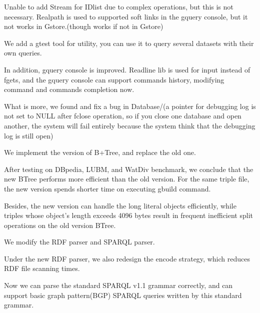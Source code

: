 \documentclass[titlepage, a4paper, 12pt]{article}
\begin{document}
Unable to add Stream for IDlist due to complex operations, but this is
not necessary. Realpath is used to supported soft links in the gquery
console, but it not works in Gstore.(though works if not in Gstore)


We add a gtest tool for utility, you can use it to query several
datasets with their own queries.

In addition, gquery console is improved. Readline lib is used for input
instead of fgets, and the gquery console can support commands history,
modifying command and commands completion now.

What is more, we found and fix a bug in Database/(a pointer for
debugging log is not set to NULL after fclose operation, so if you close
one database and open another, the system will fail entirely because the
system think that the debugging log is still open)


We implement the version of B+Tree, and replace the old one.

After testing on DBpedia, LUBM, and WatDiv benchmark, we conclude that
the new BTree performs more efficient than the old version. For the
same triple file, the new version spends shorter time on executing gbuild
command.

Besides, the new version can handle the long literal objects
efficiently, while triples whose object's length exceeds 4096 bytes
result in frequent inefficient split operations on the old version
BTree.


We modify the RDF parser and SPARQL parser.

Under the new RDF parser, we also redesign the encode strategy, which
reduces RDF file scanning times.

Now we can parse the standard SPARQL v1.1 grammar correctly, and can
support basic graph pattern(BGP) SPARQL queries written by this standard
grammar.
\end{document}

